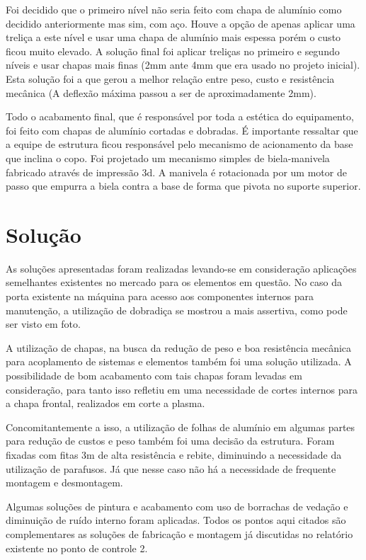 Foi decidido que o primeiro nível não seria feito com chapa de alumínio como decidido anteriormente mas sim, com aço. Houve a opção de apenas aplicar uma treliça a este nível e usar uma chapa de alumínio mais espessa porém o custo ficou muito elevado. A solução final foi aplicar treliças no primeiro e segundo níveis e usar chapas mais finas (2mm ante 4mm que era usado no projeto inicial). Esta solução foi a que gerou a melhor relação entre peso, custo e resistência mecânica (A deflexão máxima passou a ser de aproximadamente 2mm).

Todo o acabamento final, que é responsável por toda a estética do equipamento, foi feito com chapas de alumínio cortadas e dobradas. É importante ressaltar que a equipe de estrutura ficou responsável pelo mecanismo de acionamento da base que inclina o copo. Foi projetado um mecanismo simples de biela-manivela fabricado através de impressão 3d. A manivela é rotacionada por um motor de passo que empurra a biela contra a base de forma que  pivota no suporte superior.

\section{Solução}

As soluções apresentadas foram realizadas levando-se em consideração aplicações semelhantes existentes no mercado para os elementos em questão. No caso da porta existente na máquina para acesso aos componentes internos para manutenção, a utilização de dobradiça se mostrou a mais assertiva, como pode ser visto em foto.


A utilização de chapas, na busca da redução de peso e boa resistência mecânica para acoplamento de sistemas e elementos também foi uma solução utilizada. A possibilidade de bom acabamento com tais chapas foram levadas em consideração, para tanto isso refletiu em uma necessidade de cortes internos para a chapa frontal, realizados em corte a plasma. 

Concomitantemente a isso, a utilização de folhas de alumínio em algumas partes para redução de custos e peso também foi uma decisão da estrutura. Foram fixadas com fitas 3m de alta resistência e rebite, diminuindo a necessidade da utilização de parafusos. Já que nesse caso não há a necessidade de frequente montagem e desmontagem.


Algumas soluções de pintura e acabamento com uso de borrachas de vedação e diminuição de ruído interno foram aplicadas. Todos os pontos aqui citados são complementares as soluções de fabricação e montagem já discutidas no relatório existente no ponto de controle 2.